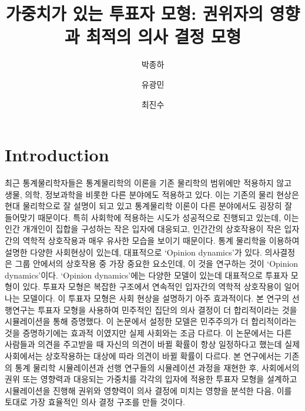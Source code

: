 \documentclass{gshs-report-v1.2}
\title{가중치가 있는 투표자 모형: 권위자의 영향과 최적의 의사 결정 모형} %
\author[1] {박종하} %
\author[2] {유광민} %
\author[3] {최진수} %
\newcommand{\gshs}{Gyeonggi Science High School }
\begin{document}
\makecover



\begin{abstractkor}
\end{abstractkor}


\section{Introduction}
최근 통계물리학자들은 통계물리학의 이론을 기존 물리학의 범위에만 적용하지 않고 생물, 의학, 정보과학을 비롯한 다른 분야에도 적용하고 있다. 이는 기존의 물리 현상은 현대 물리학으로 잘 설명이 되고 있고 통계물리학 이론이 다른 분야에서도 굉장히 잘 들어맞기 때문이다. \cite{Stauffer06} 특히 사회학에 적용하는 시도가 성공적으로 진행되고 있는데, 이는 인간 개개인이 집합을 구성하는 작은 입자에 대응되고, 인간간의 상호작용이 작은 입자간의 역학적 상호작용과 매우 유사한 모습을 보이기 때문이다.\cite{Stauffer08} 
통계 물리학을 이용하여 설명한 다양한 사회현상이 있는데, 대표적으로 ‘Opinion dynamics’가 있다. 의사결정은 그룹 안에서의 상호작용 중 가장 중요한 요소인데, 이 것을 연구하는 것이 ‘Opinion dynamics’이다.\cite{Hegselmann02} ‘Opinion dynamics’에는 다양한 모델이 있는데 대표적으로 투표자 모형이 있다. 투표자 모형은 복잡한 구조에서 연속적인 입자간의 역학적 상호작용이 일어나는 모델이다. 이 투표자 모형은 사회 현상을 설명하기 아주 효과적이다.\cite{Han10} 본 연구의 선행연구는 투표자 모형을 사용하여 민주적인 집단의 의사 결정이 더 합리적이라는 것을 시뮬레이션을 통해 증명했다. 이 논문에서 설정한 모델은 민주주의가 더 합리적이라는 것을 증명하기에는 효과적 이였지만 실제 사회와는 조금 다르다. 이 논문에서는 다른 사람들과 의견을 주고받을 때 자신의 의견이 바뀔 확률이 항상 일정하다고 했는데 실제 사회에서는 상호작용하는 대상에 따라 의견이 바뀔 확률이 다르다. 본 연구에서는 기존의 통계 물리학 시뮬레이션과 선행 연구들의 시뮬레이션 과정을 재현한 후, 사회에서의 권위 또는 영향력과 대응되는 가중치를 각각의 입자에 적용한 투표자 모형을 설계하고 시뮬레이션을 진행해 권위와 영향력이 의사 결정에 미치는 영향을 분석한 다음, 이를 토대로 가장 효율적인 의사 결정 구조를 만들 것이다.
\end{document}
